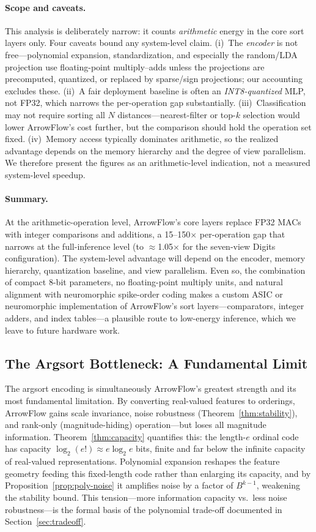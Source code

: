 \documentclass[12pt]{article}
\begin{document}
\paragraph{Scope and caveats.}
This analysis is deliberately narrow: it counts \emph{arithmetic} energy in the core sort layers only. Four caveats bound any system-level claim. (i)~The \emph{encoder} is not free---polynomial expansion, standardization, and especially the random/LDA projection use floating-point multiply--adds unless the projections are precomputed, quantized, or replaced by sparse/sign projections; our accounting excludes these. (ii)~A fair deployment baseline is often an \emph{INT8-quantized} MLP, not FP32, which narrows the per-operation gap substantially. (iii)~Classification may not require sorting all $N$ distances---nearest-filter or top-$k$ selection would lower ArrowFlow's cost further, but the comparison should hold the operation set fixed. (iv)~Memory access typically dominates arithmetic, so the realized advantage depends on the memory hierarchy and the degree of view parallelism. We therefore present the figures as an arithmetic-level indication, not a measured system-level speedup.

\paragraph{Summary.}
At the arithmetic-operation level, ArrowFlow's core layers replace FP32 MACs with integer comparisons and additions, a 15--150$\times$ per-operation gap that narrows at the full-inference level (to $\approx$1.05$\times$ for the seven-view Digits configuration). The system-level advantage will depend on the encoder, memory hierarchy, quantization baseline, and view parallelism. Even so, the combination of compact 8-bit parameters, no floating-point multiply units, and natural alignment with neuromorphic spike-order coding makes a custom ASIC or neuromorphic implementation of ArrowFlow's sort layers---comparators, integer adders, and index tables---a plausible route to low-energy inference, which we leave to future hardware work.

\subsection{The Argsort Bottleneck: A Fundamental Limit}

The argsort encoding is simultaneously ArrowFlow's greatest strength and its most fundamental limitation. By converting real-valued features to orderings, ArrowFlow gains scale invariance, noise robustness (Theorem~\ref{thm:stability}), and rank-only (magnitude-hiding) operation---but loses all magnitude information. Theorem~\ref{thm:capacity} quantifies this: the length-$e$ ordinal code has capacity $\log_2(e!) \approx e \log_2 e$ bits, finite and far below the infinite capacity of real-valued representations. Polynomial expansion reshapes the feature geometry feeding this fixed-length code rather than enlarging its capacity, and by Proposition~\ref{prop:poly-noise} it amplifies noise by a factor of $B^{k-1}$, weakening the stability bound. This tension---more information capacity vs.\ less noise robustness---is the formal basis of the polynomial trade-off documented in Section~\ref{sec:tradeoff}.
\end{document}
